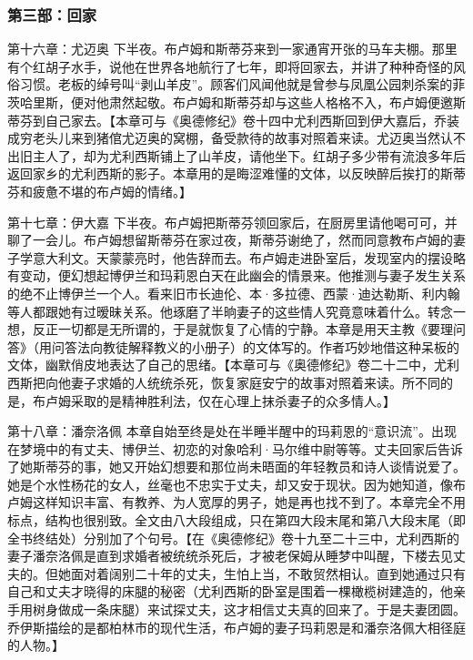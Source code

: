 \subsubsection*{第三部：回家}
\par 第十六章：尤迈奥 下半夜。布卢姆和斯蒂芬来到一家通宵开张的马车夫棚。那里有个红胡子水手，说他在世界各地航行了七年，即将回家去，并讲了种种奇怪的风俗习惯。老板的绰号叫“剥山羊皮”。顾客们风闻他就是曾参与凤凰公园刺杀案的菲茨哈里斯，便对他肃然起敬。布卢姆和斯蒂芬却与这些人格格不入，布卢姆便邀斯蒂芬到自己家去。【本章可与《奥德修纪》卷十四中尤利西斯回到伊大嘉后，乔装成穷老头儿来到猪倌尤迈奥的窝棚，备受款待的故事对照着来读。尤迈奥当然认不出旧主人了，却为尤利西斯铺上了山羊皮，请他坐下。红胡子多少带有流浪多年后返回家乡的尤利西斯的影子。本章用的是晦涩难懂的文体，以反映醉后挨打的斯蒂芬和疲惫不堪的布卢姆的情绪。】
\par 第十七章：伊大嘉 下半夜。布卢姆把斯蒂芬领回家后，在厨房里请他喝可可，并聊了一会儿。布卢姆想留斯蒂芬在家过夜，斯蒂芬谢绝了，然而同意教布卢姆的妻子学意大利文。天蒙蒙亮时，他告辞而去。布卢姆走进卧室后，发现室内的摆设略有变动，便幻想起博伊兰和玛莉恩白天在此幽会的情景来。他推测与妻子发生关系的绝不止博伊兰一个人。看来旧市长迪伦、本·多拉德、西蒙·迪达勒斯、利内翰等人都跟她有过暧昧关系。他琢磨了半晌妻子的这些情人究竟意味着什么。转念一想，反正一切都是无所谓的，于是就恢复了心情的宁静。本章是用天主教《要理问答》（用问答法向教徒解释教义的小册子）的文体写的。作者巧妙地借这种呆板的文体，幽默俏皮地表达了自己的思绪。【本章可与《奥德修纪》卷二十二中，尤利西斯把向他妻子求婚的人统统杀死，恢复家庭安宁的故事对照着来读。所不同的是，布卢姆采取的是精神胜利法，仅在心理上抹杀妻子的众多情人。】
\par 第十八章：潘奈洛佩 本章自始至终是处在半睡半醒中的玛莉恩的“意识流”。出现在梦境中的有丈夫、博伊兰、初恋的对象哈利·马尔维中尉等等。丈夫回家后告诉了她斯蒂芬的事，她又开始幻想要和那位尚未晤面的年轻教员和诗人谈情说爱了。她是个水性杨花的女人，丝毫也不忠实于丈夫，却又安于现状。因为她知道，像布卢姆这样知识丰富、有教养、为人宽厚的男子，她是再也找不到了。本章完全不用标点，结构也很别致。全文由八大段组成，只在第四大段末尾和第八大段末尾（即全书终结处）分别加了个句号。【在《奥德修纪》卷十九至二十三中，尤利西斯的妻子潘奈洛佩是直到求婚者被统统杀死后，才被老保姆从睡梦中叫醒，下楼去见丈夫的。但她面对着阔别二十年的丈夫，生怕上当，不敢贸然相认。直到她通过只有自己和丈夫才晓得的床腿的秘密（尤利西斯的卧室是围着一棵橄榄树建造的，他亲手用树身做成一条床腿）来试探丈夫，这才相信丈夫真的回来了。于是夫妻团圆。乔伊斯描绘的是都柏林市的现代生活，布卢姆的妻子玛莉恩是和潘奈洛佩大相径庭的人物。】


